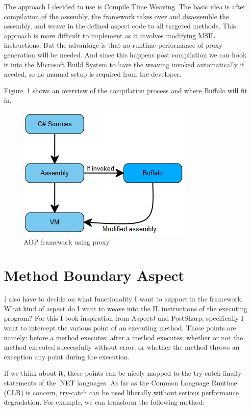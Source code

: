 The approach I decided to use is Compile Time Weaving. The basic idea is after compilation of the assembly, the framework takes over and disassemble the assembly, and weave in the defined aspect code to all targeted methods. This approach is more difficult to implement as it involves modifying MSIL instructions. But the advantage is that no runtime performance of proxy generation will be needed. And since this happens post compilation we can hook it into the Microsoft Build System to have the weaving invoked automatically if needed, so no manual setup is required from the developer.

Figure~\ref{buffalo_model} shows an overview of the compilation process and where Buffalo will fit in.

\begin{figure}[here]
  \includegraphics[scale=1.0]{BuffaloOverview.PNG}
  \centering
  \caption{AOP framework using proxy\label{buffalo_model}}
\end{figure}

\section{Method Boundary Aspect}
I also have to decide on what functionality I want to support in the framework. What kind of aspect do I want to weave into the IL instructions of the executing program? For this I took inspiration from AspectJ and PostSharp, specifically I want to intercept the various point of an executing method. Those points are namely: before a method executes; after a method executes; whether or not the method executed successfully without error; or whether the method throws an exception any point during the execution.

If we think about it, these points can be nicely mapped to the try-catch-finally statements of the .NET languages. As far as the Common Language Runtime (CLR) is concern, try-catch can be used liberally without serious performance degradation. For example, we can transform the following method:

